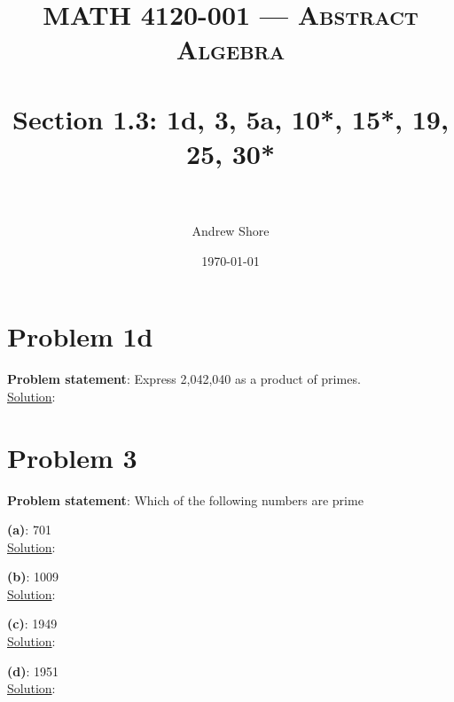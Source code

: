 \documentclass{article} %
\title{ 
\normalfont \normalsize 
\textsc{MATH 4120-001 --- Abstract Algebra} \\
\horrule{0.5pt} \\[0cm] %
\huge Section 1.3: 1d, 3, 5a, 10*, 15*, 19, 25, 30*  \\ %
\horrule{2pt} \\[0cm] %
}
\author{Andrew Shore} %
\date{\normalsize\today} %
\begin{document}
\maketitle %

\section*{Problem 1d}


\textbf{Problem statement}: Express 2,042,040 as a product of primes.
\\

\underline{Solution}: 
\begin{addmargin}[1em]{0em}

\end{addmargin}    

\newpage

\section*{Problem 3}

\textbf{Problem statement}: Which of the following numbers are prime
\\

\begin{addmargin}[1em]{0em}

\textbf{(a)}: 701
\\ \hfill \break
\underline{Solution}: 
\begin{addmargin}[1em]{0em}
\end{addmargin}

\textbf{(b)}: 1009
\\ \hfill \break
\underline{Solution}: 
\begin{addmargin}[1em]{0em}
\end{addmargin}

\textbf{(c)}: 1949
\\ \hfill \break
\underline{Solution}: 
\begin{addmargin}[1em]{0em}
\end{addmargin}

\textbf{(d)}: 1951
\\ \hfill \break
\underline{Solution}: 
\begin{addmargin}[1em]{0em}
\end{addmargin}
\end{addmargin}
\end{document}
